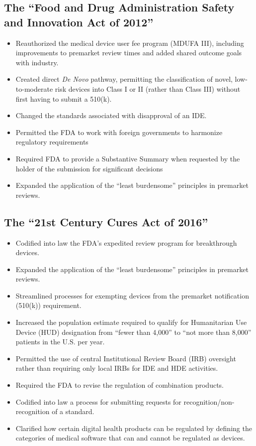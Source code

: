 \documentclass[11pt]{book}
\begin{document}
\subsection{The ``Food and Drug Administration Safety and Innovation Act of 2012''}
\begin{itemize}
	\item Reauthorized the medical device user fee program (MDUFA III), including improvements to premarket review times and added shared outcome goals with industry.
	\item Created direct \textit{De Novo} pathway, permitting the classification of novel, low-to-moderate risk devices into Class I or II (rather than Class III) without first having to submit a 510(k).
	\item Changed the standards associated with disapproval of an IDE.
	\item Permitted the FDA to work with foreign governments to harmonize regulatory requirements
	\item Required FDA to provide a Substantive Summary when requested by the holder of the submission for significant decisions
	\item Expanded the application of the ``least burdensome'' principles in premarket reviews.
\end{itemize}

\subsection{The ``21st Century Cures Act of 2016''}
\begin{itemize}
	\item Codified into law the FDA’s expedited review program for breakthrough devices.
	\item Expanded the application of the ``least burdensome'' principles in premarket reviews.
	\item Streamlined processes for exempting devices from the premarket notification (510(k)) requirement.
	\item Increased the population estimate required to qualify for Humanitarian Use Device (HUD) designation from ``fewer than 4,000'' to ``not more than 8,000'' patients in the U.S. per year.
	\item Permitted the use of central Institutional Review Board (IRB) oversight rather than requiring only local IRBs for IDE and HDE activities.
	\item Required the FDA to revise the regulation of combination products.
	\item Codified into law a process for submitting requests for recognition/non-recognition of a standard.
	\item Clarified how certain digital health products can be regulated by defining the categories of medical software that can and cannot be regulated as devices.
\end{itemize}
\end{document}
